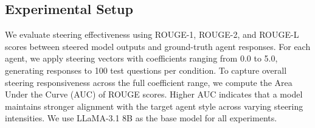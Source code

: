 \documentclass[11pt]{article}
\begin{document}


\subsection{Experimental Setup}
We evaluate steering effectiveness using ROUGE-1, ROUGE-2, and ROUGE-L scores between steered model outputs and ground-truth agent responses. 
For each agent, we apply steering vectors with coefficients ranging from 0.0 to 5.0, generating responses to 100 test questions per condition. 
To capture overall steering responsiveness across the full coefficient range, we compute the Area Under the Curve (AUC) of ROUGE scores. Higher AUC indicates that a model maintains stronger alignment with the target agent style across varying steering intensities. We use LLaMA-3.1 8B as the base model for all experiments.
\end{document}
